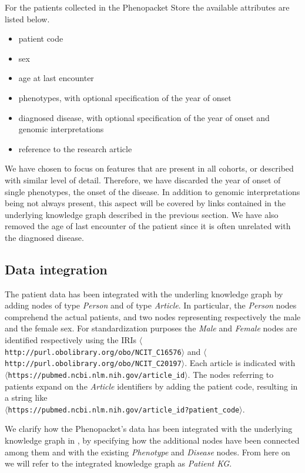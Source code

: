For the patients collected in the Phenopacket Store the available attributes are listed below.
\begin{itemize}
  \item patient code
  \item sex
  \item age at last encounter
  \item phenotypes, with optional specification of the year of onset
  \item diagnosed disease, with optional specification of the year of onset and genomic interpretations
  \item reference to the research article
\end{itemize}

We have chosen to focus on features that are present in all cohorts, or described with similar level of detail. Therefore, we have discarded the year of onset of single phenotypes, the onset of the disease. In addition to genomic interpretations being not always present, this aspect will be covered by links contained in the underlying knowledge graph described in the previous section. We have also removed the age of last encounter of the patient since it is often unrelated with the diagnosed disease.

\subsection{Data integration}
The patient data has been integrated with the underling knowledge graph by adding nodes of type \emph{Person} and of type \emph{Article}. In particular, the \emph{Person} nodes comprehend the actual patients, and two nodes representing respectively the male and the female sex. For standardization purposes the \emph{Male} and \emph{Female} nodes are identified respectively using the IRIs \texttt{$\langle$http://purl.obolibrary.org/obo/NCIT\_C16576$\rangle$} and \texttt{$\langle$http://purl.obolibrary.org/obo/NCIT\_C20197$\rangle$}. Each article is indicated with \\ \texttt{$\langle$https://pubmed.ncbi.nlm.nih.gov/{article\_id}$\rangle$}. The nodes referring to patients expand on the \emph{Article} identifiers by adding the patient code, resulting in a string like \\ \texttt{$\langle$https://pubmed.ncbi.nlm.nih.gov/{article\_id}?{patient\_code}$\rangle$}. 

We clarify how the Phenopacket's data has been integrated with the underlying knowledge graph in , by specifying how the additional nodes have been connected among them and with the existing \emph{Phenotype} and \emph{Disease} nodes. From here on we will refer to the integrated knowledge graph as \emph{Patient KG}.

